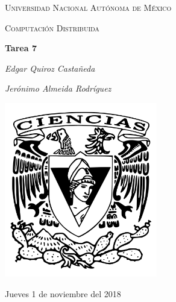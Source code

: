 \documentclass[12pt,a4paper]{report}
\begin{document}
	\begin{titlepage}
		\centering
		{\scshape\LARGE Universidad Nacional Autónoma de México \par}
		\vspace{1cm}
		{\scshape\Large Computación Distribuida\par}
		\vspace{1.5cm}
		{\huge\bfseries Tarea 7\par}
		\vspace{.5cm}
		{\Large\itshape Edgar Quiroz Castañeda \par}
		\vspace{.5cm}
		{\Large\itshape Jerónimo Almeida Rodríguez \par}
		\vfill
		 \includegraphics[width=0.5\textwidth]{escudo_f-ciencias.png}
		\vfill

		{\large Jueves 1 de noviembre del 2018 \par}
	\end{titlepage}

	\pagebreak
	\setlength{\voffset}{-0.75in}
	\setlength{\headsep}{5pt}
\end{document}
